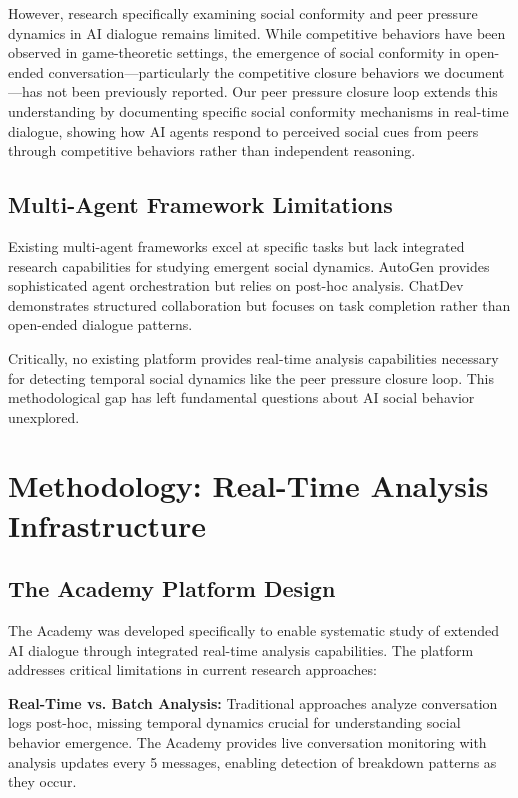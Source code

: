 \documentclass[11pt,letterpaper]{article}
\newcommand{\theacademy}{The Academy}
\begin{document}
However, research specifically examining social conformity and peer pressure dynamics in AI dialogue remains limited. While competitive behaviors have been observed in game-theoretic settings, the emergence of social conformity in open-ended conversation—particularly the competitive closure behaviors we document—has not been previously reported. Our peer pressure closure loop extends this understanding by documenting specific social conformity mechanisms in real-time dialogue, showing how AI agents respond to perceived social cues from peers through competitive behaviors rather than independent reasoning.

\subsection{Multi-Agent Framework Limitations}

Existing multi-agent frameworks excel at specific tasks but lack integrated research capabilities for studying emergent social dynamics. AutoGen \citep{wu2023autogen} provides sophisticated agent orchestration but relies on post-hoc analysis. ChatDev \citep{qian2023chatdev} demonstrates structured collaboration but focuses on task completion rather than open-ended dialogue patterns.

Critically, no existing platform provides real-time analysis capabilities necessary for detecting temporal social dynamics like the peer pressure closure loop. This methodological gap has left fundamental questions about AI social behavior unexplored.

\section{Methodology: Real-Time Analysis Infrastructure}

\subsection{The Academy Platform Design}

\theacademy{} was developed specifically to enable systematic study of extended AI dialogue through integrated real-time analysis capabilities. The platform addresses critical limitations in current research approaches:

\textbf{Real-Time vs. Batch Analysis:} Traditional approaches analyze conversation logs post-hoc, missing temporal dynamics crucial for understanding social behavior emergence. \theacademy{} provides live conversation monitoring with analysis updates every 5 messages, enabling detection of breakdown patterns as they occur.
\end{document}
